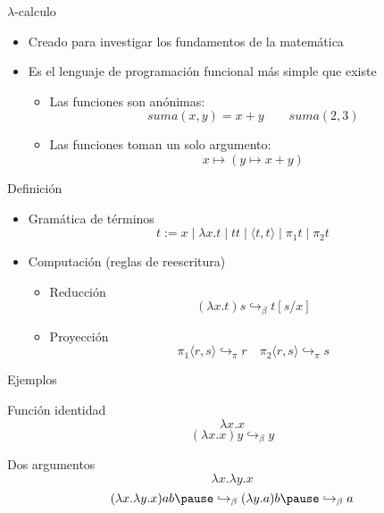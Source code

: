 \begin{frame}{$\lambda$-calculo}
	\begin{itemize}[<+->]
		\item Creado para investigar los fundamentos de la matemática
		\item Es el lenguaje de programación funcional más simple que existe
		\begin{itemize}[<+->]
			\item Las funciones son anónimas:
			\[ suma(x, y)= x + y \quad\quad suma(2, 3) \]
			\uncover<+->{
				\[ ((x, y) \mapsto x + y)(2, 3) \]
			}
			
			\item Las funciones toman un solo argumento:
			\[ x \mapsto (y \mapsto x + y) \]
			\uncover<+->{
				\[ (x \mapsto (y \mapsto x + y))\; 2 \Rightarrow y \mapsto 2 + y \]
			}
		\end{itemize}
	\end{itemize}
\end{frame}

\begin{frame}{Definición}
	\begin{itemize}[<+->]
		\item Gramática de términos
		\[ t := x \mid \lambda x.t \mid t t \mid \langle t, t \rangle \mid \pi_1 t \mid \pi_2 t \]
		
		\item Computación (reglas de reescritura)
			\begin{itemize}[<+->]
				\item Reducción
				\[ (\lambda x.t) s \hookrightarrow_\beta t[s/x] \]
				
				\item Proyección
				\[ \pi_1 \langle r, s \rangle \hookrightarrow_\pi r \quad \pi_2 \langle r, s \rangle \hookrightarrow_\pi s \]
			\end{itemize}
	\end{itemize}
	
\end{frame}

\begin{frame}{Ejemplos}
	\begin{exampleblock}{Función identidad}
		\[ \lambda x.x \]
		\pause
		\[ (\lambda x.x) y \hookrightarrow_\beta y \]
	\end{exampleblock}
	\pause
	\begin{exampleblock}{Dos argumentos}
		\[ \lambda x. \lambda y.x \]
		\[ (\lambda x. \lambda y.x) a b
		\pause \hookrightarrow_\beta (\lambda y.a) b
		\pause \hookrightarrow_\beta a \]
	\end{exampleblock}
\end{frame}


